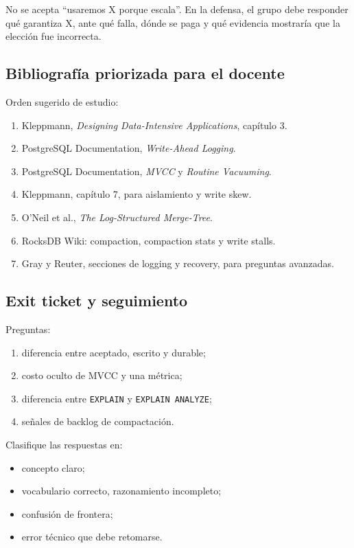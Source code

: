 \documentclass[variant=docente,cover=institutional,mode=screen]{ua-engineering-v6-article}
\begin{document}
No se acepta ``usaremos X porque escala''. En la defensa, el grupo debe responder qué garantiza X, ante qué falla, dónde se paga y qué evidencia mostraría que la elección fue incorrecta.

\subsection{Bibliografía priorizada para el docente}

Orden sugerido de estudio:

\begin{enumerate}
\item Kleppmann, \emph{Designing Data-Intensive Applications}, capítulo 3.
\item PostgreSQL Documentation, \emph{Write-Ahead Logging}.
\item PostgreSQL Documentation, \emph{MVCC} y \emph{Routine Vacuuming}.
\item Kleppmann, capítulo 7, para aislamiento y write skew.
\item O'Neil et al., \emph{The Log-Structured Merge-Tree}.
\item RocksDB Wiki: compaction, compaction stats y write stalls.
\item Gray y Reuter, secciones de logging y recovery, para preguntas avanzadas.
\end{enumerate}

\subsection{Exit ticket y seguimiento}

Preguntas:

\begin{enumerate}
\item diferencia entre aceptado, escrito y durable;
\item costo oculto de MVCC y una métrica;
\item diferencia entre \texttt{EXPLAIN} y \texttt{EXPLAIN ANALYZE};
\item señales de backlog de compactación.
\end{enumerate}

Clasifique las respuestas en:

\begin{itemize}
\item concepto claro;
\item vocabulario correcto, razonamiento incompleto;
\item confusión de frontera;
\item error técnico que debe retomarse.
\end{itemize}
\end{document}
